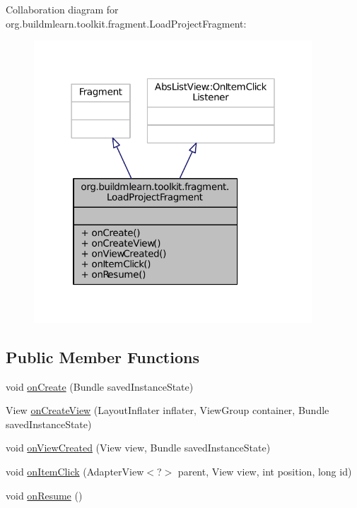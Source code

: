 Collaboration diagram for org.\-buildmlearn.\-toolkit.\-fragment.\-Load\-Project\-Fragment\-:
\nopagebreak
\begin{figure}[H]
\begin{center}
\leavevmode
\includegraphics[width=295pt]{dd/d1f/classorg_1_1buildmlearn_1_1toolkit_1_1fragment_1_1LoadProjectFragment__coll__graph}
\end{center}
\end{figure}
\subsection*{Public Member Functions}
\begin{DoxyCompactItemize}
\item 
void \hyperlink{classorg_1_1buildmlearn_1_1toolkit_1_1fragment_1_1LoadProjectFragment_aa3475b8770215affec67dd109da8e9cb}{on\-Create} (Bundle saved\-Instance\-State)
\item 
View \hyperlink{classorg_1_1buildmlearn_1_1toolkit_1_1fragment_1_1LoadProjectFragment_a00df408d1104d5e9da684300c7d1a373}{on\-Create\-View} (Layout\-Inflater inflater, View\-Group container, Bundle saved\-Instance\-State)
\item 
void \hyperlink{classorg_1_1buildmlearn_1_1toolkit_1_1fragment_1_1LoadProjectFragment_a486509578e69cb110ec10c53c6c813c6}{on\-View\-Created} (View view, Bundle saved\-Instance\-State)
\item 
void \hyperlink{classorg_1_1buildmlearn_1_1toolkit_1_1fragment_1_1LoadProjectFragment_ab3fd6e093c178f367cf3403496d30fd5}{on\-Item\-Click} (Adapter\-View$<$?$>$ parent, View view, int position, long id)
\item 
void \hyperlink{classorg_1_1buildmlearn_1_1toolkit_1_1fragment_1_1LoadProjectFragment_af7ebf8d42c3c401e7fcad1fa3850001c}{on\-Resume} ()
\end{DoxyCompactItemize}


